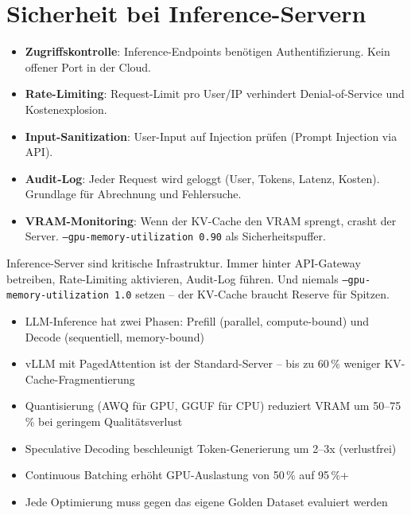 \section{Sicherheit bei Inference-Servern}

\begin{itemize}[leftmargin=*]
    \item \textbf{Zugriffskontrolle}: Inference-Endpoints benötigen Authentifizierung. Kein offener Port in der Cloud.
    \item \textbf{Rate-Limiting}: Request-Limit pro User/IP verhindert Denial-of-Service und Kostenexplosion.
    \item \textbf{Input-Sanitization}: User-Input auf Injection prüfen (Prompt Injection via API).
    \item \textbf{Audit-Log}: Jeder Request wird geloggt (User, Tokens, Latenz, Kosten). Grundlage für Abrechnung und Fehlersuche.
    \item \textbf{VRAM-Monitoring}: Wenn der KV-Cache den VRAM sprengt, crasht der Server. \texttt{--gpu-memory-utilization 0.90} als Sicherheitspuffer.
\end{itemize}

\begin{praxishinweis}
Inference-Server sind kritische Infrastruktur. Immer hinter API-Gateway betreiben, Rate-Limiting aktivieren, Audit-Log führen. Und niemals \texttt{--gpu-memory-utilization 1.0} setzen -- der KV-Cache braucht Reserve für Spitzen.
\end{praxishinweis}

\begin{zusammenfassung}
\begin{itemize}[leftmargin=*]
    \item LLM-Inference hat zwei Phasen: Prefill (parallel, compute-bound) und Decode (sequentiell, memory-bound)
    \item vLLM mit PagedAttention ist der Standard-Server -- bis zu 60\,\% weniger KV-Cache-Fragmentierung
    \item Quantisierung (AWQ für GPU, GGUF für CPU) reduziert VRAM um 50--75\,\% bei geringem Qualitätsverlust
    \item Speculative Decoding beschleunigt Token-Generierung um 2--3x (verlustfrei)
    \item Continuous Batching erhöht GPU-Auslastung von 50\,\% auf 95\,\%+
    \item Jede Optimierung muss gegen das eigene Golden Dataset evaluiert werden
\end{itemize}
\end{zusammenfassung}

